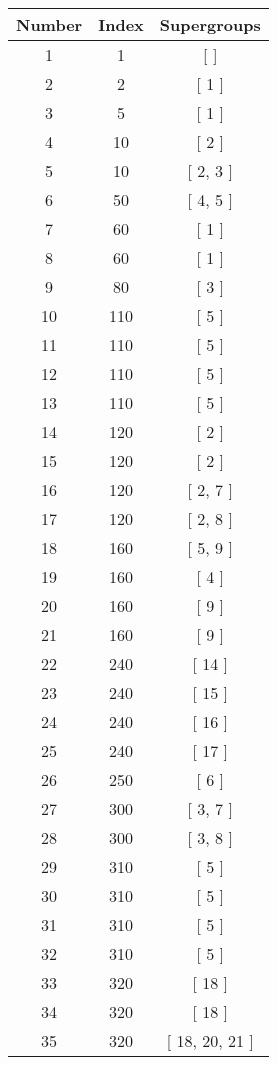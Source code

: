 \begin{center}
\begin{longtable}[H]{|| c c c ||}
\hline
Number & Index & Supergroups \\ 
\hline
1 & 1 & [ ] \\ 
\hline
2 & 2 & [ 1 ] \\ 
\hline
3 & 5 & [ 1 ] \\ 
\hline
4 & 10 & [ 2 ] \\ 
\hline
5 & 10 & [ 2, 3 ] \\ 
\hline
6 & 50 & [ 4, 5 ] \\ 
\hline
7 & 60 & [ 1 ] \\ 
\hline
8 & 60 & [ 1 ] \\ 
\hline
9 & 80 & [ 3 ] \\ 
\hline
10 & 110 & [ 5 ] \\ 
\hline
11 & 110 & [ 5 ] \\ 
\hline
12 & 110 & [ 5 ] \\ 
\hline
13 & 110 & [ 5 ] \\ 
\hline
14 & 120 & [ 2 ] \\ 
\hline
15 & 120 & [ 2 ] \\ 
\hline
16 & 120 & [ 2, 7 ] \\ 
\hline
17 & 120 & [ 2, 8 ] \\ 
\hline
18 & 160 & [ 5, 9 ] \\ 
\hline
19 & 160 & [ 4 ] \\ 
\hline
20 & 160 & [ 9 ] \\ 
\hline
21 & 160 & [ 9 ] \\ 
\hline
22 & 240 & [ 14 ] \\ 
\hline
23 & 240 & [ 15 ] \\ 
\hline
24 & 240 & [ 16 ] \\ 
\hline
25 & 240 & [ 17 ] \\ 
\hline
26 & 250 & [ 6 ] \\ 
\hline
27 & 300 & [ 3, 7 ] \\ 
\hline
28 & 300 & [ 3, 8 ] \\ 
\hline
29 & 310 & [ 5 ] \\ 
\hline
30 & 310 & [ 5 ] \\ 
\hline
31 & 310 & [ 5 ] \\ 
\hline
32 & 310 & [ 5 ] \\ 
\hline
33 & 320 & [ 18 ] \\ 
\hline
34 & 320 & [ 18 ] \\ 
\hline
35 & 320 & [ 18, 20, 21 ] \\ 

\end{longtable}
\end{center}
